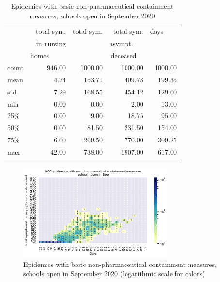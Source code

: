 \documentclass[graybox]{svmult}
\begin{document}
\begin{table}[t]
\center
\small
\begin{tabular}{lrrrr}
\hline\noalign{\smallskip}
{} & total sym.        &  total sym. & total sym.     & days~~~~ \\
{} & in nursing        &                  & asympt.~~~  & \\
{} & homes~~~~~  &                  & deceased~~ & \\
\noalign{\smallskip}\svhline\noalign{\smallskip}
count &     946.00 &             1000.00 &                 1000.00 & 1000.00 \\
mean  &       4.24 &              153.71 &                  409.73 &  199.35 \\
std   &       7.29 &              168.55 &                  454.12 &  129.00 \\
min   &       0.00 &                0.00 &                    2.00 &   13.00 \\
25\%   &       0.00 &                9.00 &                   18.75 &   95.00 \\
50\%   &       0.00 &               81.50 &                  231.50 &  154.00 \\
75\%   &       6.00 &              269.50 &                  770.00 &  309.25 \\
max   &      42.00 &              738.00 &                 1907.00 &  617.00 \\
\hline\noalign{\smallskip}
\end{tabular}

\label{EpidemicsWithAndSchoolT}
\caption{Epidemics with basic non-pharmaceutical containment measures, schools open in September 2020}
\end{table}


\begin{figure}[t]
\begin{center}
\includegraphics[width=0.7\textwidth]{HM30_readRunResults1k_basicControl_schoolOpenSept_plusHMlog.png}
\caption{Epidemics with basic non-pharmaceutical containment measures, schools open in September 2020 (logarithmic scale for colors)}
\label{EpidemicsWithAndSchoolHM}
\end{center}
\end{figure}
\end{document}
